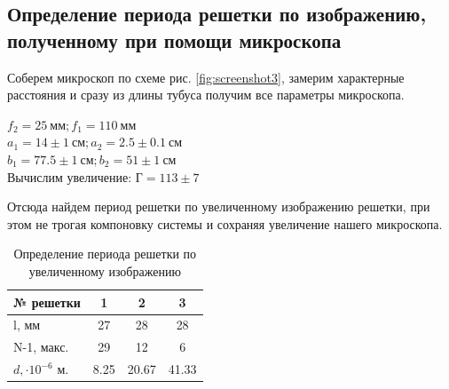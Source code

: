 \documentclass[a4paper, 12pt]{article}%
\begin{document}
	\subsection{Определение периода решетки по изображению, полученному при помощи микроскопа}
	Соберем микроскоп по схеме рис. \ref{fig:screenshot3}, замерим характерные расстояния и сразу из длины тубуса получим все параметры микроскопа.\\
	\begin{center}
		$f_2 = 25~мм;f_1 = 110~мм$\\
	
	$a_1 = 14\pm1~см;a_2 = 2.5\pm0.1~см$\\
	$b_1 = 77.5\pm1~см;b_2 = 51\pm1~см$\\
	Вычислим увеличение: Г$ = 113\pm7$\\
	\end{center}
	Отсюда найдем период решетки по увеличенному изображению решетки, при этом не трогая компоновку системы и сохраняя увеличение нашего микроскопа.
	\begin{table}[H]
		\centering
		\begin{tabular}{|l|c|c|c|}
			\hline
			№ решетки & 1    & 2     & 3     \\ \hline
			l, мм & 27   & 28    & 28    \\ \hline
			N-1, макс. & 29   & 12    & 6     \\ \hline
			$d, \cdot 10^{-6}$ м. & 8.25 & 20.67 & 41.33 \\ \hline
		\end{tabular}
	\caption{Определение периода решетки по увеличенному изображению}
	\end{table}
\end{document}
